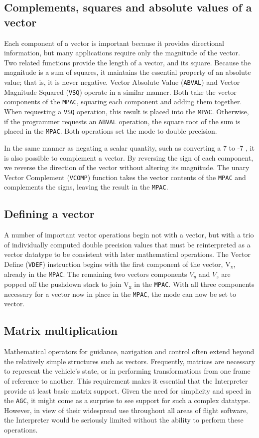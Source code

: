 \documentclass[refcap, oxford]{ahsan}
\begin{document}
\subsection{Complements, squares and absolute values of a vector}
Each component of a vector is important because it provides directional information, but many applications require only the magnitude of the vector. Two related functions provide the length of a vector, and its square. Because the magnitude is a sum of squares, it maintains the essential property of an absolute value; that is, it is never negative. Vector Absolute Value (\texttt{ABVAL}) and Vector Magnitude Squared (\texttt{VSQ}) operate in a similar manner. Both take the vector components of the \texttt{MPAC}, squaring each component and adding them together. When requesting a \texttt{VSQ} operation, this result is placed into the \texttt{MPAC}. Otherwise, if the programmer requests an \texttt{ABVAL} operation, the square root of the sum is placed in the \texttt{MPAC}. Both operations set the mode to double precision.

In the same manner as negating a scalar quantity, such as converting a 7 to -7 , it is also possible to complement a vector. By reversing the sign of each component, we reverse the direction of the vector without altering its magnitude. The unary Vector Complement (\texttt{VCOMP}) function takes the vector contents of the \texttt{MPAC} and complements the signs, leaving the result in the \texttt{MPAC}.


\subsection{Defining a vector}
A number of important vector operations begin not with a vector, but with a trio of individually computed double precision values that must be reinterpreted as a vector datatype to be consistent with later mathematical operations. The Vector Define (\texttt{VDEF}) instruction begins with the first component of the vector, $\mathrm{V}_{\mathrm{x}}$, already in the \texttt{MPAC}. The remaining two vectors components $V_{y}$ and $V_{z}$ are popped off the pushdown stack to join $\mathrm{V}_{\mathrm{x}}$ in the \texttt{MPAC}. With all three components necessary for a vector now in place in the \texttt{MPAC}, the mode can now be set to vector.


\subsection{Matrix multiplication}
Mathematical operators for guidance, navigation and control often extend beyond the relatively simple structures such as vectors. Frequently, matrices are necessary to represent the vehicle's state, or in performing transformations from one frame of reference to another. This requirement makes it essential that the Interpreter provide at least basic matrix support. Given the need for simplicity and speed in the \texttt{AGC}, it might come as a surprise to see support for such a complex datatype. However, in view of their widespread use throughout all areas of flight software, the Interpreter would be seriously limited without the ability to perform these operations.
\end{document}
